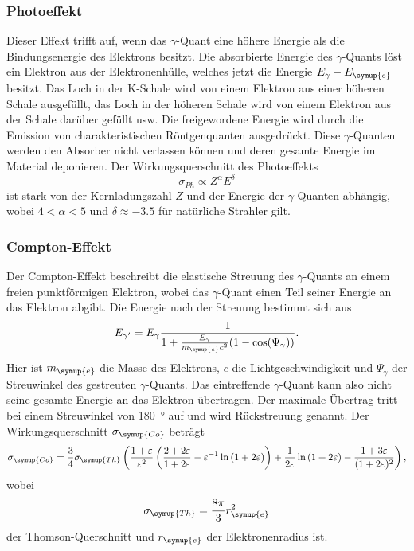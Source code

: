 \subsubsection{Photoeffekt}
Dieser Effekt trifft auf, wenn das $\gamma$-Quant eine höhere Energie als die Bindungsenergie des Elektrons besitzt.
Die absorbierte Energie des $\gamma$-Quants löst ein Elektron aus der Elektronenhülle, welches jetzt die Energie $E_\gamma-E_{\symup{e}}$ besitzt.
Das Loch in der K-Schale wird von einem Elektron aus einer höheren Schale ausgefüllt, das Loch in der höheren Schale wird von einem Elektron aus der Schale darüber gefüllt usw.
Die freigewordene Energie wird durch die Emission von charakteristischen Röntgenquanten ausgedrückt.
Diese $\gamma$-Quanten werden den Absorber nicht verlassen können und deren gesamte Energie im Material deponieren.
Der Wirkungsquerschnitt des Photoeffekts
\begin{equation*}
\sigma_{Ph}\propto Z^\alpha E^\delta
\end{equation*}
ist stark von der Kernladungszahl $Z$ und der Energie der $\gamma$-Quanten abhängig, wobei $4<\alpha<5$ und $\delta\approx -3.5$ für natürliche Strahler gilt.

\subsubsection{Compton-Effekt}
Der Compton-Effekt beschreibt die elastische Streuung des $\gamma$-Quants an einem freien punktförmigen Elektron, wobei das $\gamma$-Quant einen Teil seiner Energie an das Elektron abgibt.
Die Energie nach der Streuung bestimmt sich aus
\begin{equation}
E_{\gamma'}=E_{\gamma}\frac{1}{1+\frac{E_{\gamma}}{m_{\symup{e}} c^2}(1-\cos(\Psi_{\gamma}))}.
\end{equation}
Hier ist $m_{\symup{e}}$ die Masse des Elektrons, $c$ die Lichtgeschwindigkeit und $\Psi_{\gamma}$ der Streuwinkel des gestreuten $\gamma$-Quants.
Das eintreffende $\gamma$-Quant kann also nicht seine gesamte Energie an das Elektron übertragen.
Der maximale Übertrag tritt bei einem Streuwinkel von \SI{180}{\degree} auf und wird Rückstreuung genannt.
Der Wirkungsquerschnitt $\sigma_{\symup{Co}}$ beträgt
\begin{align*}
      \sigma_{\symup{Co}} = \frac{3}{4}\sigma_{\symup{Th}}\left(\frac{1+\varepsilon}{\varepsilon^2}\left(\frac{2+2\varepsilon}{1+2\varepsilon}-\varepsilon^{-1}\ln{(1+2\varepsilon)}\right)
      + \frac{1}{2\varepsilon}\ln{(1+2\varepsilon)} - \frac{1+3\varepsilon}{(1+2\varepsilon)^2}\right),
\end{align*}
wobei 
\begin{equation*}
\sigma_{\symup{Th}} =\frac{8\pi}{3}r_{\symup{e}}^2
\end{equation*}
der Thomson-Querschnitt und $r_{\symup{e}}$ der Elektronenradius ist.

